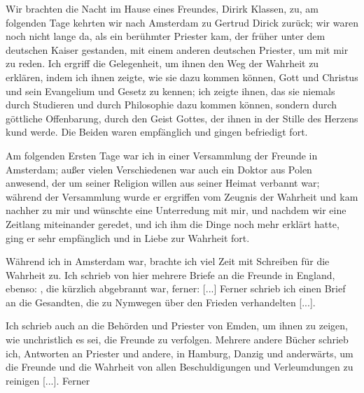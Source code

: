 Wir brachten die Nacht im Hause eines Freundes, Dirirk
Klassen, zu, am folgenden Tage 
kehrten wir nach Amsterdam zu
Gertrud Dirick zurück; wir waren noch nicht lange da, als ein
berühmter Priester kam, der früher unter dem deutschen Kaiser
gestanden, mit einem anderen deutschen Priester, um mit mir zu
reden. Ich ergriff die Gelegenheit, um ihnen den Weg der
Wahrheit zu erklären, indem ich ihnen zeigte, wie sie dazu kommen
können, Gott und Christus und sein Evangelium und Gesetz zu
kennen; ich zeigte ihnen, das sie niemals durch Studieren und
durch Philosophie dazu kommen können, sondern durch göttliche
Offenbarung, durch den Geist Gottes, der ihnen in der Stille des
Herzens kund werde. Die Beiden waren empfänglich und gingen
befriedigt fort.

Am folgenden Ersten Tage war ich in einer Versammlung
der Freunde in Amsterdam; außer vielen Verschiedenen 
war auch ein Doktor aus Polen anwesend, der um seiner Religion
willen aus seiner Heimat verbannt war; während der 
Versammlung wurde er ergriffen vom Zeugnis der Wahrheit und kam
nachher zu mir und wünschte eine Unterredung mit mir, und
nachdem wir eine Zeitlang miteinander geredet, und ich ihm die
Dinge noch mehr erklärt hatte, ging er sehr empfänglich und in
Liebe zur Wahrheit fort.

Während ich in Amsterdam war, brachte ich viel Zeit mit
Schreiben für die Wahrheit zu. Ich schrieb von hier mehrere Briefe
an die Freunde in England, ebenso: , die kürzlich abgebrannt war,
ferner: 
 [...]
Ferner schrieb ich einen Brief an die Gesandten, die zu 
Nymwegen über den Frieden verhandelten [...].

Ich schrieb auch an die Behörden und Priester von Emden,
um ihnen zu zeigen, wie unchristlich es sei, die Freunde zu 
verfolgen. Mehrere andere Bücher schrieb ich, Antworten an Priester
und andere, in Hamburg, Danzig und 
anderwärts, um die Freunde
und die Wahrheit von allen Beschuldigungen und Verleumdungen
zu reinigen [...]. Ferner 

